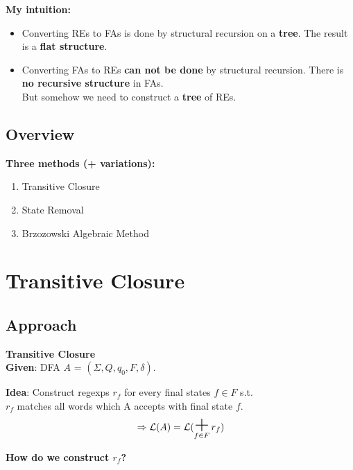 \documentclass{beamer}
\DeclareMathOperator*{\bigplus}{\mbox{\huge +}}
\begin{document}
\begin{frame}
    \textbf{My intuition:} 
    \begin{itemize}
        \item
            Converting REs to FAs is done by structural recursion on a \textbf{tree}. The result is a \textbf{flat structure}.

            \pause

        \item
            Converting FAs to REs \textbf{can not be done} by structural recursion.
            There is \textbf{no recursive structure} in FAs. \\
            But somehow we need to construct a \textbf{tree} of REs.
    \end{itemize}



\end{frame}

\subsection*{Overview}
\begin{frame}

    \textbf{Three methods (+ variations):}

    \begin{enumerate}
        \item Transitive Closure
        \item State Removal
        \item Brzozowski Algebraic Method
    \end{enumerate}

\end{frame}

\section{Transitive Closure}
\subsection*{Approach}
\begin{frame}

    \large{\textbf{Transitive Closure}} \\

    \textbf{Given}: DFA $A$ = $(\Sigma, Q, q_0, F, \delta)$.

    \textbf{Idea}: Construct regexps $r_f$ for every final states $f \in F$ s.t. \\$r_f$ matches all words which A accepts with final state $f$. \\

    \[
        \, \Rightarrow \mathcal{L}(A) = \mathcal{L}(\bigplus\limits_{f \in F} r_f)
    \]

    \vspace{5 mm}

    \textbf{How do we construct $r_f$?} 

\end{frame}
\end{document}
